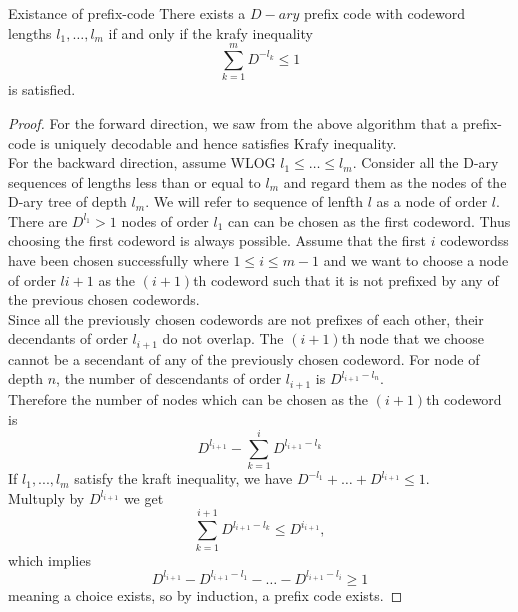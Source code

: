 \documentclass[../main.tex]{subfiles}
\begin{document}
\begin{bbox}{Existance of prefix-code}
    There exists a $D-ary$ prefix code with codeword lengths $l_1,\dots,l_m$ if and only if the krafy inequality \begin{equation*}
        \sum_{k=1}^{m} D^{-l_k} \leq 1
    \end{equation*} is satisfied.
    \begin{proof}
        For the forward direction, we saw from the above algorithm that a prefix-code is uniquely decodable and hence satisfies Krafy inequality. \\
        For the backward direction, assume WLOG $l_1\leq \dots\leq l_m$. Consider all the D-ary sequences of lengths less than or equal to $l_m$ and regard them as the nodes of the D-ary tree of depth $l_m$. We will refer to sequence of lenfth $l$ as a node of order $l$. There are $D^{l_1}>1$ nodes of order $l_1$ can can be chosen as the first codeword. Thus choosing the first codeword is always possible. Assume that the first $i$ codewordss have been chosen successfully where $1\leq i\leq m-1$ and we want to choose a node of order $l{i+1}$ as the $(i+1)$th codeword such that it is not prefixed by any of the previous chosen codewords.\\
        Since all the previously chosen codewords are not prefixes of each other, their decendants of order $l_{i+1}$ do not overlap. The $(i+1)$th node that we choose cannot be a secendant of any of the previously chosen codeword. For node of depth $n$, the number of descendants of order $l_{i+1}$ is $D^{l_{i+1}-l_n}$. \\
        Therefore the number of nodes which can be chosen as the $(i+1)$th codeword is \[
        D^{l_{i+1}}-\sum_{k=1}^iD^{l_{i+1}-l_k}
        \]
        If $l_1,...,l_m$ satisfy the kraft inequality, we have $D^{-l_1}+\dots + D^{l_{i+1}}\leq 1$.\\ 
        Multuply by $D^{l_{i+1}}$ we get 
        \[
        \sum_{k=1}^{i+1}D^{l_{i+1}-l_k}\leq D^{i_{i+1}},
        \]
        which implies \[
        D^{l_{i+1}}-D^{l_{i+1}-l_1}-\dots -D^{l_{i+1}-l_i}\geq 1
        \]
        meaning a choice exists, so by induction, a prefix code exists.
    \end{proof}
\end{bbox}
\end{document}
